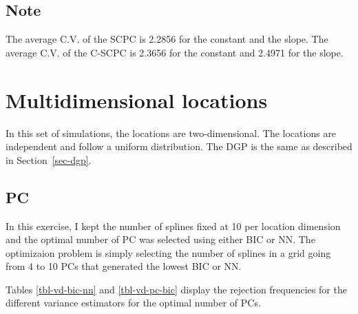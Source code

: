 \documentclass[
]{article}
\begin{document}
\hypertarget{note}{%
\subsection*{Note}\label{note}}

The average C.V. of the SCPC is 2.2856 for the constant and the slope.
The average C.V. of the C-SCPC is 2.3656 for the constant and 2.4971 for
the slope.

\hypertarget{sec-multi}{%
\section{Multidimensional locations}\label{sec-multi}}

In this set of simulations, the locations are two-dimensional. The
locations are independent and follow a uniform distribution. The DGP is
the same as described in Section~\ref{sec-dgp}.

\hypertarget{pc}{%
\subsection{PC}\label{pc}}

In this exercise, I kept the number of splines fixed at 10 per location
dimension and the optimal number of PC was selected using either BIC or
NN. The optimizaion problem is simply selecting the number of splines in
a grid going from 4 to 10 PCs that generated the lowest BIC or NN.

Tables \ref{tbl-vd-bic-nn} and \ref{tbl-vd-pc-bic} display the rejection
frequencies for the different variance estimators for the optimal number
of PCs.
\end{document}
